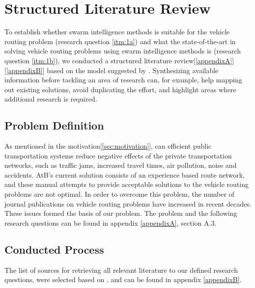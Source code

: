 \section{Structured Literature Review}
To establish whether swarm intelligence methods is suitable for the vehicle routing problem (research question \ref{itm:1a}) and what the state-of-the-art in solving vehicle routing problems using swarm intelligence methods is (research question \ref{itm:1b}), we conducted a structured literature review[\ref{appendixA}][\ref{appendixB}] based on the model suggested by \citet{kofod2014}. Synthesizing available information before tackling an area of research can, for example, help mapping out existing solutions, avoid duplicating the effort, and highlight areas where additional research is required\citep{kofod2014}. 

\subsection{Problem Definition}
As mentioned in the motivation[\ref{sec:motivation}], can efficient public transportation systems reduce negative effects of the private transportation networks, such as traffic jams, increased travel times, air pollution, noise and accidents. AtB's current solution consists of an experience based route network, and these manual attempts to provide acceptable solutions to the vehicle routing problems are not optimal. In order to overcome this problem, the number of journal publications on vehicle routing problems have increased in recent decades. These issues formed the basis of our problem. The problem and the following research questions can be found in appendix \ref{appendixA}, section A.3. 

\subsection{Conducted Process}
The list of sources for retrieving all relevant literature to our defined research questions, were selected based on \citep[p.3]{kofod2014}, and can be found in appendix \ref{appendixB}. 

